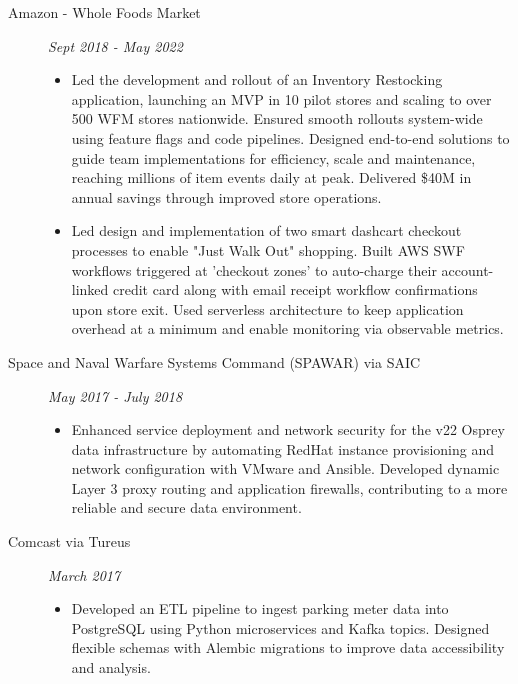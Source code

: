 \documentclass[11pt]{article}
\begin{document}
\begin{description}
\begin{description}
        \item[Amazon - Whole Foods Market] \hfill \textit{Sept 2018 - May 2022}
        \begin{itemize}[leftmargin=*]
            \item Led the development and rollout of an Inventory Restocking application,
            launching an MVP in 10 pilot stores and scaling to over 500 WFM stores nationwide.
            Ensured smooth rollouts system-wide using feature flags and code pipelines.
            Designed end-to-end solutions to guide team implementations for efficiency, scale and
            maintenance, reaching millions of item events daily at peak. Delivered \$40M in annual savings
            through improved store operations.

            \item Led design and implementation of two smart dashcart checkout processes to
            enable "Just Walk Out" shopping. Built AWS SWF workflows triggered at 'checkout zones'
            to auto-charge their account-linked credit card along with email receipt workflow
            confirmations upon store exit. Used serverless architecture to keep application overhead
            at a minimum and enable monitoring via observable metrics.
        \end{itemize}

        \item[Space and Naval Warfare Systems Command (SPAWAR) via SAIC] \hfill \textit{May 2017 - July 2018}
        \begin{itemize}[leftmargin=*]
        \item Enhanced service deployment and network security for the v22 Osprey data
            infrastructure by automating RedHat instance provisioning and network configuration
            with VMware and Ansible. Developed dynamic Layer 3 proxy routing and application
            firewalls, contributing to a more reliable and secure data environment.
        \end{itemize}

        \item[Comcast via Tureus] \hfill \textit{March 2017}
        \begin{itemize}[leftmargin=*]
            \item Developed an ETL pipeline to ingest parking meter data into
            PostgreSQL using Python microservices and Kafka topics. Designed flexible
            schemas with Alembic migrations to improve data accessibility
            and analysis.
        \end{itemize}


\end{description}
\end{description}
\end{document}
